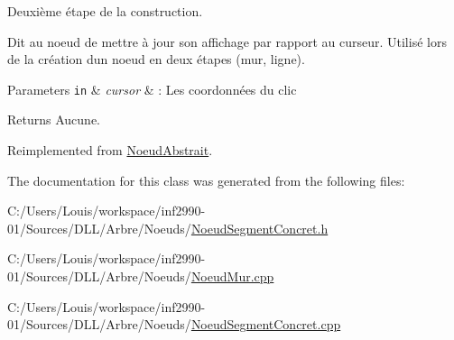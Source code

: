 Deuxième étape de la construction. 

Dit au noeud de mettre à jour son affichage par rapport au curseur. Utilisé lors de la création d\textquotesingle{}un noeud en deux étapes (mur, ligne).


\begin{DoxyParams}[1]{Parameters}
\mbox{\tt in}  & {\em cursor} & \+: Les coordonnées du clic\\
\hline
\end{DoxyParams}
\begin{DoxyReturn}{Returns}
Aucune. 
\end{DoxyReturn}


Reimplemented from \hyperlink{group__inf2990_ga233fd4600812176c557bb94ea04da5c9}{Noeud\+Abstrait}.



The documentation for this class was generated from the following files\+:\begin{DoxyCompactItemize}
\item 
C\+:/\+Users/\+Louis/workspace/inf2990-\/01/\+Sources/\+D\+L\+L/\+Arbre/\+Noeuds/\hyperlink{_noeud_segment_concret_8h}{Noeud\+Segment\+Concret.\+h}\item 
C\+:/\+Users/\+Louis/workspace/inf2990-\/01/\+Sources/\+D\+L\+L/\+Arbre/\+Noeuds/\hyperlink{_noeud_mur_8cpp}{Noeud\+Mur.\+cpp}\item 
C\+:/\+Users/\+Louis/workspace/inf2990-\/01/\+Sources/\+D\+L\+L/\+Arbre/\+Noeuds/\hyperlink{_noeud_segment_concret_8cpp}{Noeud\+Segment\+Concret.\+cpp}\end{DoxyCompactItemize}
